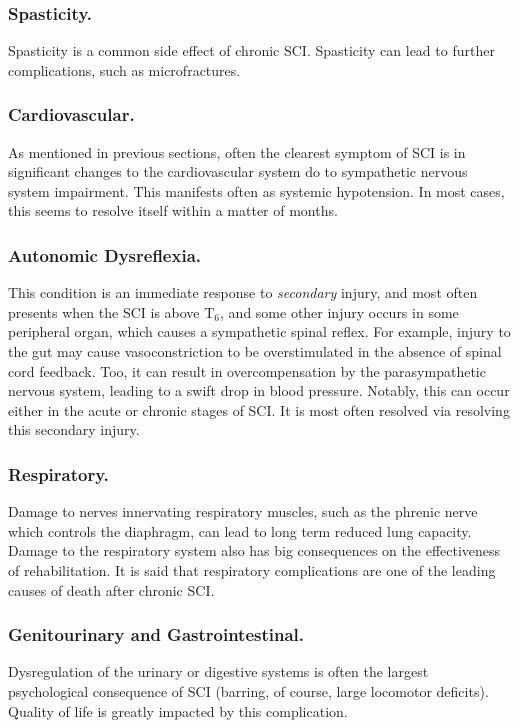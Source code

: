 \documentclass[12pt]{report}
\begin{document}
\subsubsection{Spasticity.}
Spasticity is a common side effect of chronic SCI. Spasticity can lead to further complications, such as microfractures. 

\subsubsection{Cardiovascular.}
As mentioned in previous sections, often the clearest symptom of SCI is in significant changes to the cardiovascular system do to sympathetic nervous system impairment. This manifests often as systemic hypotension. In most cases, this seems to resolve itself within a matter of months. 

\subsubsection{Autonomic Dysreflexia.}
This condition is an immediate response to \textit{secondary} injury, and most often presents when the SCI is above T$_6$, and some other injury occurs in some peripheral organ, which causes a sympathetic spinal reflex. For example, injury to the gut may cause vasoconstriction to be overstimulated in the absence of spinal cord feedback. Too, it can result in overcompensation by the parasympathetic nervous system, leading to a swift drop in blood pressure. Notably, this can occur either in the acute or chronic stages of SCI. It is most often resolved via resolving this secondary injury. 

\subsubsection{Respiratory.}
Damage to nerves innervating respiratory muscles, such as the phrenic nerve which controls the diaphragm, can lead to long term reduced lung capacity. Damage to the respiratory system also has big consequences on the effectiveness of rehabilitation. It is said that respiratory complications are one of the leading causes of death after chronic SCI.

\subsubsection{Genitourinary and Gastrointestinal.}
Dysregulation of the urinary or digestive systems is often the largest psychological consequence of SCI (barring, of course, large locomotor deficits). Quality of life is greatly impacted by this complication. 
\end{document}
